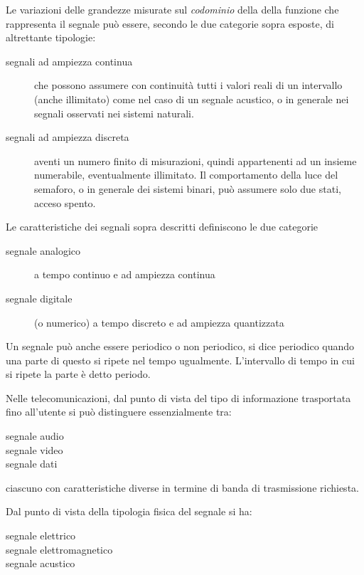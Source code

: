 Le variazioni delle grandezze misurate sul \emph{codominio} della della funzione
che rappresenta il segnale può essere, secondo le due categorie sopra esposte, di
altrettante tipologie:

\begin{description}
  \item[segnali ad ampiezza continua] che possono assumere con continuità tutti
  i valori reali di un intervallo (anche illimitato) come nel caso di un segnale
  acustico, o in generale nei segnali osservati nei sistemi naturali.
  \item[segnali ad ampiezza discreta] aventi un numero finito di misurazioni,
  quindi appartenenti ad un insieme numerabile, eventualmente illimitato.
  Il comportamento della luce del semaforo, o in generale dei sistemi binari, può
  assumere solo due stati, acceso spento.
\end{description}

Le caratteristiche dei segnali sopra descritti definiscono le due categorie

\begin{description}
  \item[segnale analogico] a tempo continuo e ad ampiezza continua
  \item[segnale digitale] (o numerico) a tempo discreto e ad ampiezza quantizzata
\end{description}

Un segnale può anche essere periodico o non periodico, si dice periodico quando
una parte di questo si ripete nel tempo ugualmente. L'intervallo di tempo in cui
si ripete la parte è detto periodo.

Nelle telecomunicazioni, dal punto di vista del tipo di informazione trasportata
fino all'utente si può distinguere essenzialmente tra:

\begin{description}
\item[segnale audio]
\item[segnale video]
\item[segnale dati]
\end{description}

ciascuno con caratteristiche diverse in termine di banda di trasmissione richiesta.

Dal punto di vista della tipologia fisica del segnale si ha:

\begin{description}
\item[segnale elettrico]
\item[segnale elettromagnetico]
\item[segnale acustico]
\end{description}

%

\clearpage
